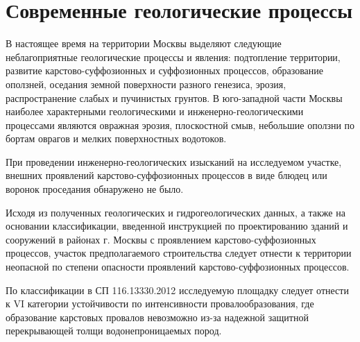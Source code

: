 \chapter*{Современные геологические процессы}

В настоящее время на территории Москвы выделяют следующие неблагоприятные геологические процессы и явления: подтопление территории, развитие карстово-суффозионных и суффозионных процессов, образование оползней, оседания земной поверхности разного генезиса, эрозия, распространение слабых и пучинистых грунтов. В юго-западной части Москвы наиболее характерными геологическими и инженерно-геологическими процессами являются овражная эрозия, плоскостной смыв, небольшие оползни по бортам оврагов и мелких поверхностных водотоков.

При проведении инженерно-геологических изысканий на исследуемом участке, внешних проявлений карстово-суффозионных процессов в виде блюдец или воронок проседания обнаружено не было.

Исходя из полученных геологических и гидрогеологических данных, а также на основании классификации, введенной инструкцией по проектированию зданий и сооружений в районах г. Москвы с проявлением карстово-суффозионных процессов, участок предполагаемого строительства следует отнести к территории неопасной по степени опасности проявлений карстово-суффозионных процессов.

По классификации в СП 116.13330.2012 исследуемую площадку следует отнести к VI категории устойчивости по интенсивности провалообразования, где образование карстовых провалов невозможно из-за надежной защитной перекрывающей толщи водонепроницаемых пород.